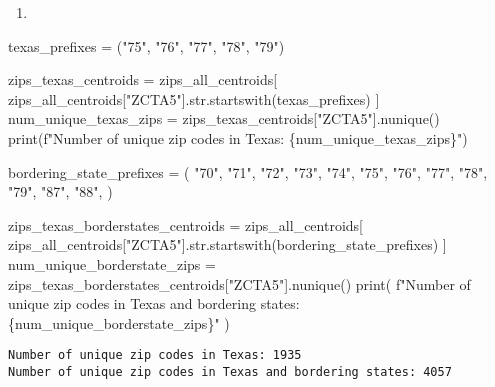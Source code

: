 \documentclass[
  letterpaper,
  DIV=11,
  numbers=noendperiod]{scrartcl}
\newenvironment{Shaded}{\begin{snugshade}}{\end{snugshade}}
\newcommand{\BuiltInTok}[1]{\textcolor[rgb]{0.00,0.23,0.31}{#1}}
\newcommand{\NormalTok}[1]{\textcolor[rgb]{0.00,0.23,0.31}{#1}}
\newcommand{\OperatorTok}[1]{\textcolor[rgb]{0.37,0.37,0.37}{#1}}
\newcommand{\SpecialCharTok}[1]{\textcolor[rgb]{0.37,0.37,0.37}{#1}}
\newcommand{\SpecialStringTok}[1]{\textcolor[rgb]{0.13,0.47,0.30}{#1}}
\newcommand{\StringTok}[1]{\textcolor[rgb]{0.13,0.47,0.30}{#1}}
\providecommand{\tightlist}{%
  \setlength{\itemsep}{0pt}\setlength{\parskip}{0pt}}\usepackage{longtable,booktabs,array}
\begin{document}
\begin{enumerate}
\def\labelenumi{\arabic{enumi}.}
\setcounter{enumi}{1}
\tightlist
\item
\end{enumerate}

\begin{Shaded}
\begin{Highlighting}[]
\NormalTok{texas\_prefixes }\OperatorTok{=}\NormalTok{ (}\StringTok{"75"}\NormalTok{, }\StringTok{"76"}\NormalTok{, }\StringTok{"77"}\NormalTok{, }\StringTok{"78"}\NormalTok{, }\StringTok{"79"}\NormalTok{)}

\NormalTok{zips\_texas\_centroids }\OperatorTok{=}\NormalTok{ zips\_all\_centroids[}
\NormalTok{    zips\_all\_centroids[}\StringTok{"ZCTA5"}\NormalTok{].}\BuiltInTok{str}\NormalTok{.startswith(texas\_prefixes)}
\NormalTok{]}
\NormalTok{num\_unique\_texas\_zips }\OperatorTok{=}\NormalTok{ zips\_texas\_centroids[}\StringTok{"ZCTA5"}\NormalTok{].nunique()}
\BuiltInTok{print}\NormalTok{(}\SpecialStringTok{f"Number of unique zip codes in Texas: }\SpecialCharTok{\{}\NormalTok{num\_unique\_texas\_zips}\SpecialCharTok{\}}\SpecialStringTok{"}\NormalTok{)}

\NormalTok{bordering\_state\_prefixes }\OperatorTok{=}\NormalTok{ (}
    \StringTok{"70"}\NormalTok{,}
    \StringTok{"71"}\NormalTok{,}
    \StringTok{"72"}\NormalTok{,}
    \StringTok{"73"}\NormalTok{,}
    \StringTok{"74"}\NormalTok{,}
    \StringTok{"75"}\NormalTok{,}
    \StringTok{"76"}\NormalTok{,}
    \StringTok{"77"}\NormalTok{,}
    \StringTok{"78"}\NormalTok{,}
    \StringTok{"79"}\NormalTok{,}
    \StringTok{"87"}\NormalTok{,}
    \StringTok{"88"}\NormalTok{,}
\NormalTok{)}

\NormalTok{zips\_texas\_borderstates\_centroids }\OperatorTok{=}\NormalTok{ zips\_all\_centroids[}
\NormalTok{    zips\_all\_centroids[}\StringTok{"ZCTA5"}\NormalTok{].}\BuiltInTok{str}\NormalTok{.startswith(bordering\_state\_prefixes)}
\NormalTok{]}
\NormalTok{num\_unique\_borderstate\_zips }\OperatorTok{=}\NormalTok{ zips\_texas\_borderstates\_centroids[}\StringTok{"ZCTA5"}\NormalTok{].nunique()}
\BuiltInTok{print}\NormalTok{(}
    \SpecialStringTok{f"Number of unique zip codes in Texas and bordering states: }\SpecialCharTok{\{}\NormalTok{num\_unique\_borderstate\_zips}\SpecialCharTok{\}}\SpecialStringTok{"}
\NormalTok{)}
\end{Highlighting}
\end{Shaded}

\begin{verbatim}
Number of unique zip codes in Texas: 1935
Number of unique zip codes in Texas and bordering states: 4057
\end{verbatim}
\end{document}
